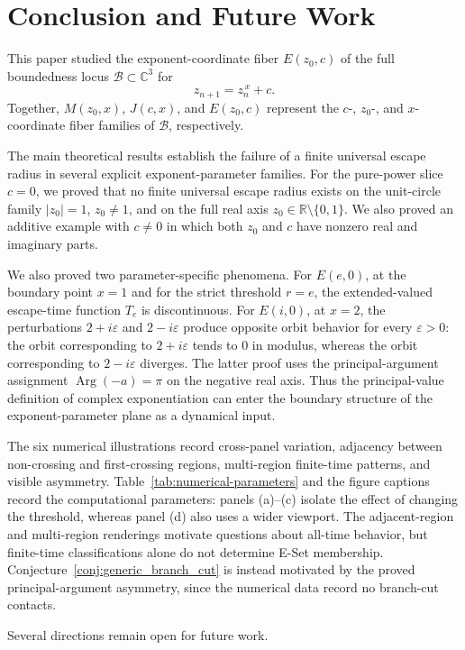 \documentclass[12pt,a4paper]{amsart}
\theoremstyle{remark}
\newcommand{\C}{\mathbb{C}}
\newcommand{\R}{\mathbb{R}}
\begin{document}
\section{Conclusion and Future Work}

This paper studied the exponent-coordinate fiber $E(z_0,c)$ of the full
boundedness locus $\mathcal{B}\subset\C^3$ for
\[
z_{n+1}=z_n^{\,x}+c.
\]
Together, $M(z_0,x)$, $J(c,x)$, and $E(z_0,c)$ represent the $c$-, $z_0$-,
and $x$-coordinate fiber families of $\mathcal{B}$, respectively.

The main theoretical results establish the failure of a finite universal escape
radius in several explicit exponent-parameter families. For the pure-power
slice $c=0$, we proved that no finite universal escape radius exists on the
unit-circle family $|z_0|=1$, $z_0\ne 1$, and on the full real axis
$z_0\in\R\setminus\{0,1\}$. We also proved an additive example with
$c\ne0$ in which both $z_0$ and $c$ have nonzero real and imaginary parts.

We also proved two parameter-specific phenomena. For $E(e,0)$, at the boundary
point $x=1$ and for the strict threshold $r=e$, the extended-valued escape-time
function $T_e$ is discontinuous. For $E(i,0)$, at $x=2$, the perturbations
$2+i\varepsilon$ and $2-i\varepsilon$ produce opposite orbit behavior for
every $\varepsilon>0$: the orbit corresponding to $2+i\varepsilon$ tends to
$0$ in modulus, whereas the orbit corresponding to $2-i\varepsilon$ diverges.
The latter proof uses the principal-argument assignment
$\operatorname{Arg}(-a)=\pi$ on the
negative real axis. Thus the principal-value definition of complex
exponentiation can enter the boundary structure of the exponent-parameter plane
as a dynamical input.

The six numerical illustrations record cross-panel variation, adjacency
between non-crossing and first-crossing regions, multi-region finite-time
patterns, and visible asymmetry. Table~\ref{tab:numerical-parameters} and the
figure captions record the computational parameters: panels (a)--(c) isolate
the effect of changing the threshold, whereas panel (d) also uses a wider
viewport. The adjacent-region and multi-region renderings motivate questions
about all-time behavior, but finite-time classifications alone do not determine
E-Set membership. Conjecture~\ref{conj:generic_branch_cut} is instead motivated
by the proved principal-argument asymmetry, since the numerical data record no
branch-cut contacts.

Several directions remain open for future work.
\end{document}
